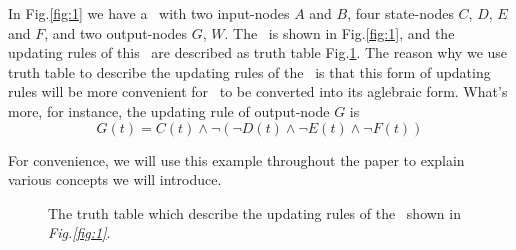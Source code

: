 \begin{example}
In Fig.\ref{fig:1} we have a \BCN\ with two input-nodes $A$ and $B$, four state-nodes $C$, $D$, $E$ and $F$, and two output-nodes $G$, $W$. The \BCN\ is shown in Fig.\ref{fig:1}, and the updating rules of this \BCN\ are described as truth table Fig.\ref{fig:2}. The reason why we use truth table to describe the updating rules of the \BCN\ is that this form of updating rules will be more convenient for \BCN\ to be converted into its aglebraic form. What's more, for instance, the updating rule of output-node $G$ is 
\[G(t)=C(t)\wedge \neg(\neg{D(t)}\wedge \neg E(t)\wedge \neg F(t))\]
	
For convenience, we will use this example throughout the 
 paper to explain various concepts we will introduce.
  \begin{figure}[thpb]
      \centering
      
      \caption{The truth table which describe the updating rules of the \BCN\ shown in {\em Fig.\ref{fig:1}}.}
      \label{fig:2}
   \end{figure}
\end{example}   


